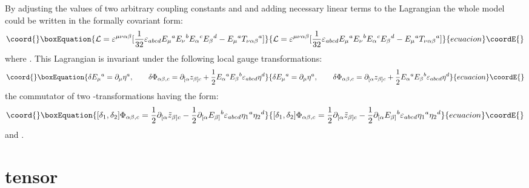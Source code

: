 \documentclass[a4paper,12pt]{article}
\begin{document}
By adjusting the values of two arbitrary coupling constants \myHighlight{$\kappa$}\coordHE{}
and \coordHE{} and adding necessary linear terms to the Lagrangian the
whole model could be written in the formally covariant form:
\begin{equation}\coord{}\boxEquation{
{\cal L} = \varepsilon^{\mu\nu\alpha\beta} [ \frac{1}{32}
\varepsilon_{abcd} E_\mu{}^a E_\nu{}^b E_\alpha{}^c E_\beta{}^d -
E_\mu{}^a T_{\nu\alpha\beta}{}^a ]
}{
{\cal L} = \varepsilon^{\mu\nu\alpha\beta} [ \frac{1}{32}
\varepsilon_{abcd} E_\mu{}^a E_\nu{}^b E_\alpha{}^c E_\beta{}^d -
E_\mu{}^a T_{\nu\alpha\beta}{}^a ]
}{ecuacion}\coordE{}\end{equation}
where \coordHE{}. This Lagrangian
is invariant under the following local gauge transformations:
\begin{equation}\coord{}\boxEquation{
\delta E_\mu{}^a = \partial_\mu \eta^a, \qquad \delta
\Phi_{\alpha\beta,c} = \partial_{[\alpha} z_{\beta]c} + \frac{1}{2}
E_\alpha{}^a E_\beta{}^b \varepsilon_{abcd} \eta^d
}{
\delta E_\mu{}^a = \partial_\mu \eta^a, \qquad \delta
\Phi_{\alpha\beta,c} = \partial_{[\alpha} z_{\beta]c} + \frac{1}{2}
E_\alpha{}^a E_\beta{}^b \varepsilon_{abcd} \eta^d
}{ecuacion}\coordE{}\end{equation}
the commutator of two \myHighlight{$\eta$}\coordHE{}-transformations having the form:
\begin{equation}\coord{}\boxEquation{
[\delta_1, \delta_2] \Phi_{\alpha\beta,c} = \frac{1}{2}
\partial_{[\alpha} \tilde{z}_{\beta]c} - \frac{1}{2}
\partial_{[\alpha} E_{\beta]}{}^b \varepsilon_{abcd} \eta_1{}^a
\eta_2{}^d
}{
[\delta_1, \delta_2] \Phi_{\alpha\beta,c} = \frac{1}{2}
\partial_{[\alpha} \tilde{z}_{\beta]c} - \frac{1}{2}
\partial_{[\alpha} E_{\beta]}{}^b \varepsilon_{abcd} \eta_1{}^a
\eta_2{}^d
}{ecuacion}\coordE{}\end{equation}
and \coordHE{}.


\section{\coordHE{} tensor}
\end{document}
